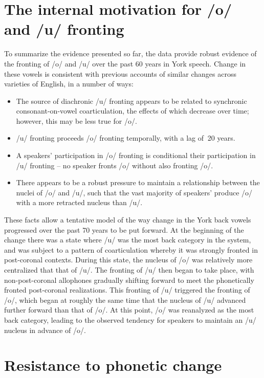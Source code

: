 \documentclass[12pt]{article}
\begin{document}
\section{The internal motivation for /o/ and /u/ fronting}
To summarize the evidence presented so far, the data provide robust evidence of the fronting of /o/ and /u/ over the past 60 years in York speech. Change in these vowels is consistent with previous accounts of similar changes across varieties of English, in a number of ways:

\begin{itemize}
\item{The source of diachronic /u/ fronting appears to be related to synchronic consonant-on-vowel coarticulation, the effects of which decrease over time; however, this may be less true for /o/.}

\item{/u/ fronting proceeds /o/ fronting temporally, with a lag of $~$20 years.}

\item{A speakers' participation in /o/ fronting is conditional their participation in /u/ fronting -- no speaker fronts /o/ without also fronting /o/.}

\item{There appears to be a robust pressure to maintain a relationship between the nuclei of /o/ and /u/, such that the vast majority of speakers' produce /o/ with a more retracted nucleus than /u/.}
\end{itemize}

These facts allow a tentative model of the way change in the York back vowels progressed over the past 70 years to be put forward. At the beginning of the change there was a state where /u/ was the most back category in the system, and was subject to a pattern of coarticulation whereby it was strongly fronted in post-coronal contexts. During this state, the nucleus of /o/ was relatively more centralized that that of /u/. The fronting of /u/ then began to take place, with non-post-coronal allophones gradually shifting forward to meet the phonetically fronted post-coronal realizations. This fronting of /u/ triggered the fronting of /o/, which began at roughly the same time that the nucleus of /u/ advanced further forward than that of /o/. At this point, /o/ was reanalyzed as the most back category, leading to the observed tendency for speakers to maintain an /u/ nucleus in advance of /o/.

\section{Resistance to phonetic change}
\end{document}
